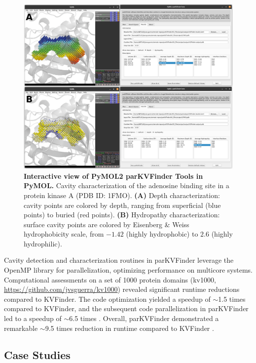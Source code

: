\documentclass[Ingles]{phdthesis}
\begin{document}
\begin{figure}[ht]
  \centering
  \includegraphics[scale=1]{images/pymol2-parkvfinder-tools-visualization.png}
  \caption[Interactive view of PyMOL2 parKVFinder Tools in PyMOL]{\textbf{Interactive view of PyMOL2 parKVFinder Tools in PyMOL.} Cavity characterization of the adenosine binding site in a protein kinase A (PDB ID: 1FMO). \textbf{(A)} Depth characterization: cavity points are colored by depth, ranging from superficial (blue points) to buried (red points). \textbf{(B)} Hydropathy characterization: surface cavity points are colored by Eisenberg & Weiss hydrophobicity scale, from $-1.42$ (highly hydrophobic) to $2.6$ (highly hydrophilic).}
  \label{fig:pymol2-parkvfinder-tools-visualization}
\end{figure}

Cavity detection and characterization routines in parKVFinder leverage the OpenMP library for parallelization, optimizing performance on multicore systems. Computational assessments on a set of 1000 protein domains (kv1000, \url{https://github.com/jvsguerra/kv1000}) revealed significant runtime reductions compared to KVFinder. The code optimization yielded a speedup of $\sim$1.5 times \cite{guerra2019} compared to KVFinder, and the subsequent code parallelization in parKVFinder led to a speedup of $\sim$6.5 times \cite{guerra2020}. Overall, parKVFinder demonstrated a remarkable $\sim$9.5 times reduction in runtime compared to KVFinder \cite{guerra2019,guerra2020}.

\subsection{Case Studies}
\end{document}
